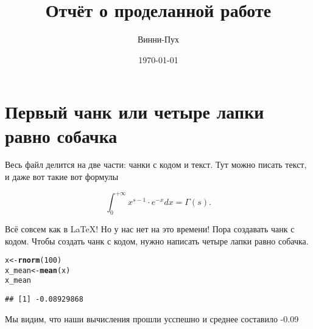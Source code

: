 \documentclass[12pt, a4paper]{article}\usepackage[]{graphicx}\usepackage[]{color}
\title{Отчёт о проделанной работе}
\author{Винни-Пух}
\date{\today}
\makeatletter
\newcommand{\hlnum}[1]{\textcolor[rgb]{0.686,0.059,0.569}{#1}}%
\newcommand{\hlstd}[1]{\textcolor[rgb]{0.345,0.345,0.345}{#1}}%
\newcommand{\hlkwb}[1]{\textcolor[rgb]{0.69,0.353,0.396}{#1}}%
\newcommand{\hlkwd}[1]{\textcolor[rgb]{0.737,0.353,0.396}{\textbf{#1}}}%
\newenvironment{kframe}{%
 \def\at@end@of@kframe{}%
 \ifinner\ifhmode%
  \def\at@end@of@kframe{\end{minipage}}%
  \begin{minipage}{\columnwidth}%
 \fi\fi%
 \def\FrameCommand##1{\hskip\@totalleftmargin \hskip-\fboxsep
 \colorbox{shadecolor}{##1}\hskip-\fboxsep
     \hskip-\linewidth \hskip-\@totalleftmargin \hskip\columnwidth}%
 \MakeFramed {\advance\hsize-\width
   \@totalleftmargin\z@ \linewidth\hsize
   \@setminipage}}%
 {\par\unskip\endMakeFramed%
 \at@end@of@kframe}
\newenvironment{knitrout}{}{} %
\makeatother
\begin{document}

\maketitle  %


\section{Первый чанк или четыре лапки равно собачка}

Весь файл делится на две части: чанки с кодом и текст. Тут можно писать текст, и даже вот такие вот формулы

\[ 
\int_{0}^{+\infty} x^{s-1} \cdot e^{-x} dx = \Gamma(s). 
\]

Всё совсем как в \LaTeX! Но у нас нет на это времени! Пора создавать чанк с кодом. Чтобы создать чанк с кодом, нужно написать четыре лапки равно собачка. 


\begin{knitrout}
\color{fgcolor}\begin{kframe}
\begin{alltt}
\hlstd{x} \hlkwb{<-} \hlkwd{rnorm}\hlstd{(}\hlnum{100}\hlstd{)}
\hlstd{x_mean} \hlkwb{<-} \hlkwd{mean}\hlstd{(x)}
\hlstd{x_mean}
\end{alltt}
\begin{verbatim}
## [1] -0.08929868
\end{verbatim}
\end{kframe}
\end{knitrout}

Мы видим, что наши вычисления прошли усспешно и среднее составило -0.09



\end{document}
